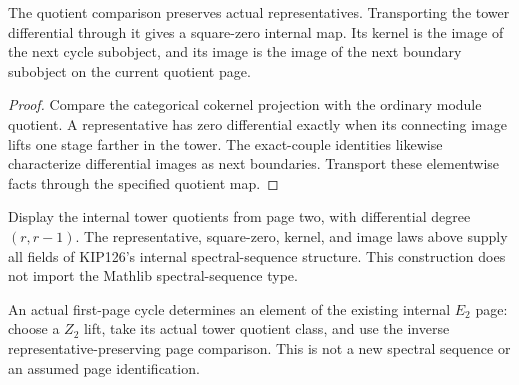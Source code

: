 \begin{proposition}
  \label{prop:h6-tower-internal-laws}
  \leanok
  The quotient comparison preserves actual representatives. Transporting
  the tower differential through it gives a square-zero internal map.
  Its kernel is the image of the next cycle subobject, and its image is
  the image of the next boundary subobject on the current quotient page.
\end{proposition}
\begin{proof}
  Compare the categorical cokernel projection with the ordinary module
  quotient. A representative has zero differential exactly when its
  connecting image lifts one stage farther in the tower. The exact-couple
  identities likewise characterize differential images as next boundaries.
  Transport these elementwise facts through the specified quotient map.
  \leanok
\end{proof}

\begin{definition}
  \label{def:h6-tower-internal-sequence}
  \leanok
  Display the internal tower quotients from page two, with differential
  degree $(r,r-1)$. The representative, square-zero, kernel, and image laws
  above supply all fields of KIP126's internal spectral-sequence structure.
  This construction does not import the Mathlib spectral-sequence type.
\end{definition}

\begin{definition}
  \label{def:h6-first-cycle-internal-class}
  \leanok
  An actual first-page cycle determines an element of the existing internal
  $E_2$ page: choose a $Z_2$ lift, take its actual tower quotient class,
  and use the inverse representative-preserving page comparison.
  This is not a new spectral sequence or an assumed page identification.
\end{definition}

